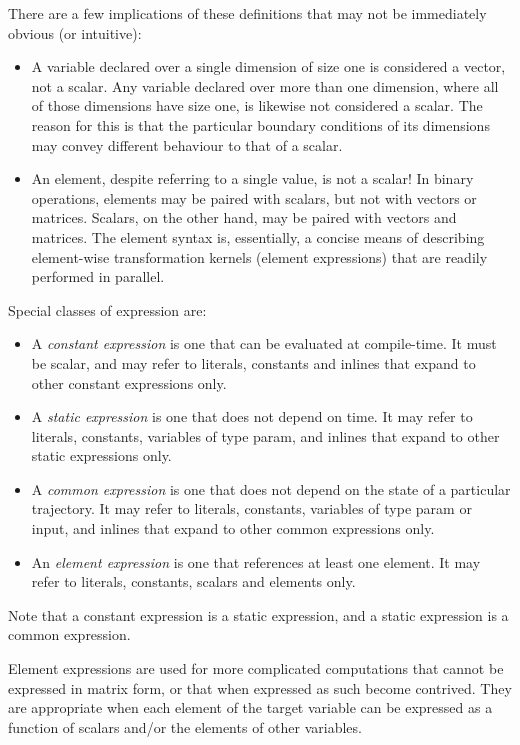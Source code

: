 There are a few implications of these definitions that may not be immediately
obvious (or intuitive):
\begin{itemize}
\item A variable declared over a single dimension of size one is considered a
  vector, not a scalar. Any variable declared over more than one dimension,
  where all of those dimensions have size one, is likewise not considered a
  scalar. The reason for this is that the particular boundary conditions of
  its dimensions may convey different behaviour to that of a scalar.

\item An element, despite referring to a single value, is not a scalar! In
  binary operations, elements may be paired with scalars, but not with vectors
  or matrices. Scalars, on the other hand, may be paired with vectors and
  matrices. The element syntax is, essentially, a concise means of describing
  element-wise transformation kernels (element expressions) that are readily performed in parallel.

\end{itemize}

Special classes of expression are:
\begin{itemize}
\item A \textit{constant expression} is one that
  can be evaluated at compile-time. It must be scalar, and may refer to
  literals, constants and inlines that expand to other constant expressions
  only.
\item A \textit{static expression} is one that does
  not depend on time. It may refer to literals, constants, variables of type
  \textsf{param}, and inlines that expand to other static expressions only.
\item A \textit{common expression} is one that does
  not depend on the state of a particular trajectory. It may refer to
  literals, constants, variables of type \textsf{param} or \textsf{input}, and
  inlines that expand to other common expressions only.
\item An \textit{element expression} is one that
  references at least one element. It may refer to literals, constants,
  scalars and elements only.
\end{itemize}
Note that a constant expression is a static expression, and a static
expression is a common expression.

Element expressions are used for more complicated computations that cannot be
expressed in matrix form, or that when expressed as such become contrived.
They are appropriate when each element of the target variable can be expressed
as a function of scalars and/or the elements of other variables.

